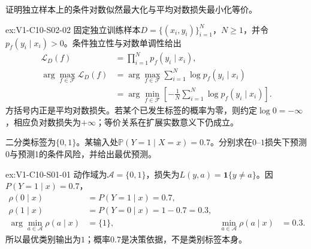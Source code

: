 \begin{SLChapterExercisePairSection}

\begin{exercise}\label{ex:V1-C10-S02-02}
证明独立样本上的条件对数似然最大化与平均对数损失最小化等价。
\end{exercise}
\label{sol:V1-C10-S02-02}
\begin{chapterexercisesolution}{ex:V1-C10-S02-02}
固定独立训练样本$D=\{(x_i,y_i)\}_{i=1}^{N}$，$N\ge1$，并令
$p_f(y_i\mid x_i)>0$。条件独立性与对数单调性给出
\[
\begin{aligned}
\mathcal L_D(f)
  &=\prod_{i=1}^{N}p_f(y_i\mid x_i),\\
\arg\max_{f\in\mathcal F}\mathcal L_D(f)
  &=\arg\max_{f\in\mathcal F}
    \sum_{i=1}^{N}\log p_f(y_i\mid x_i)\\
  &=\arg\min_{f\in\mathcal F}
    \left[-\frac1N\sum_{i=1}^{N}\log p_f(y_i\mid x_i)\right].
\end{aligned}
\]
方括号内正是平均对数损失。若某个已发生标签的概率为零，则约定$\log0=-\infty$，相应负对数损失为$+\infty$；等价关系在扩展实数意义下仍成立。
\end{chapterexercisesolution}

\begin{exercise}\label{ex:V1-C10-S01-01}
二分类标签为$\{0,1\}$。某输入处$\mathbb P(Y=1\mid X=x)=0.7$。分别求在$0$--$1$损失下预测0与预测1的条件风险，并给出最优预测。
\end{exercise}
\label{sol:V1-C10-S01-01}
\begin{chapterexercisesolution}{ex:V1-C10-S01-01}
动作域为$\mathcal A=\{0,1\}$，损失为$L(y,a)=\mathbf1\{y\ne a\}$。因
$P(Y=1\mid x)=0.7$，
\[
\begin{aligned}
\rho(0\mid x)&=P(Y=1\mid x)=0.7,\\
\rho(1\mid x)&=P(Y=0\mid x)=1-0.7=0.3,\\
\arg\min_{a\in\mathcal A}\rho(a\mid x)&=\{1\},&
\min_{a\in\mathcal A}\rho(a\mid x)&=0.3.
\end{aligned}
\]
所以最优类别输出为$1$；概率$0.7$是决策依据，不是类别标签本身。
\end{chapterexercisesolution}


\end{SLChapterExercisePairSection}
